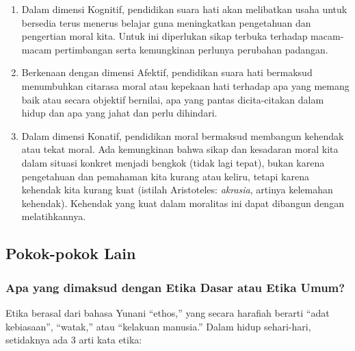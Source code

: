 \documentclass[11pt,twoside,a5paper,openany]{memoir}
\def\tightlist{}
\begin{document}
\begin{enumerate}
\def\labelenumi{\arabic{enumi}.}
\tightlist
\item
  Dalam dimensi Kognitif, pendidikan suara hati akan melibatkan usaha
  untuk bersedia terus menerus belajar guna meningkatkan pengetahuan dan
  pengertian moral kita. Untuk ini diperlukan sikap terbuka terhadap
  macam-macam pertimbangan serta kemungkinan perlunya perubahan
  padangan.
\item
  Berkenaan dengan dimensi Afektif, pendidikan suara hati bermaksud
  menumbuhkan citarasa moral atau kepekaan hati terhadap apa yang memang
  baik atau secara objektif bernilai, apa yang pantas dicita-citakan
  dalam hidup dan apa yang jahat dan perlu dihindari.
\item
  Dalam dimensi Konatif, pendidikan moral bermaksud membangun kehendak
  atau tekat moral. Ada kemungkinan bahwa sikap dan kesadaran moral kita
  dalam situasi konkret menjadi bengkok (tidak lagi tepat), bukan karena
  pengetahuan dan pemahaman kita kurang atau keliru, tetapi karena
  kehendak kita kurang kuat (istilah Aristoteles: \emph{akrasia},
  artinya kelemahan kehendak). Kehendak yang kuat dalam moralitas ini
  dapat dibangun dengan melatihkannya.
\end{enumerate}

\hypertarget{pokok-pokok-lain-7}{%
\subsection{Pokok-pokok Lain}\label{pokok-pokok-lain-7}}

\hypertarget{apa-yang-dimaksud-dengan-etika-dasar-atau-etika-umum}{%
\subsubsection{Apa yang dimaksud dengan Etika Dasar atau Etika
Umum?}\label{apa-yang-dimaksud-dengan-etika-dasar-atau-etika-umum}}

Etika berasal dari bahasa Yunani ``ethos,'' yang secara harafiah berarti
``adat kebiasaan'', ``watak,'' atau ``kelakuan manusia.'' Dalam hidup
sehari-hari, setidaknya ada 3 arti kata etika:
\end{document}
